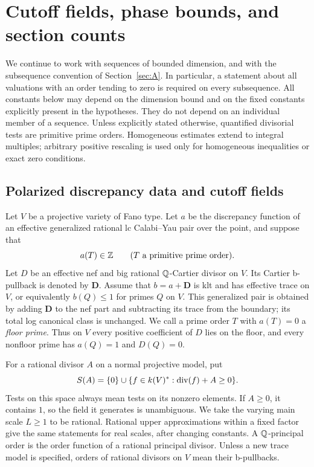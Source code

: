 \section{Cutoff fields, phase bounds, and section counts}\label{sec:C}

We continue to work with sequences of bounded dimension, and with the
subsequence convention of Section~\ref{sec:A}.  In particular, a statement
about all valuations with an order tending to zero is required on every
subsequence.  All constants below may depend on the dimension bound and
on the fixed constants explicitly present in the hypotheses.  They do
not depend on an individual member of a sequence.  Unless explicitly
stated otherwise, quantified divisorial tests are primitive prime
orders.  Homogeneous estimates extend to integral multiples; arbitrary
positive rescaling is used only for homogeneous inequalities or exact
zero conditions.

\subsection{Polarized discrepancy data and cutoff fields}
\label{subsec:C-cutoffs}

Let $V$ be a projective variety of Fano type.  Let $a$ be the discrepancy
function of an effective generalized rational lc Calabi--Yau pair over
the point, and suppose that
\[
                 a(T)\in\mathbb Z\qquad(T\text{ a primitive prime order}).
\]
Let $D$ be an effective nef and big rational $\mathbb Q$-Cartier divisor on
$V$.  Its Cartier b-pullback is denoted by $\mathbf D$.  Assume that
$b=a+\mathbf D$ is klt and has effective trace on $V$, or equivalently
$b(Q)\leq1$ for primes $Q$ on $V$.  This generalized pair is obtained
by adding $\mathbf D$ to the nef part and subtracting its trace from
the boundary; its total log canonical class is unchanged.  We call a
prime order $T$ with $a(T)=0$ a \emph{floor prime}.  Thus on $V$ every
positive coefficient of $D$ lies on the floor, and every nonfloor prime
has $a(Q)=1$ and $D(Q)=0$.

For a rational divisor $A$ on a normal projective model, put
\begin{equation}\label{eq:C-function-space}
 S(A)=\{0\}\cup\{f\in k(V)^*:\operatorname{div}(f)+A\geq0\}.
\end{equation}
Tests on this space always mean tests on its nonzero elements.  If
$A\geq0$, it contains $1$, so the field it generates is unambiguous.
We take the varying main scale $L\geq1$ to be rational.  Rational upper
approximations within a fixed factor give the same statements for real
scales, after changing constants.  A $\mathbb Q$-principal order is the order
function of a rational principal divisor.  Unless a new trace model is
specified, orders of rational divisors on $V$ mean their b-pullbacks.

